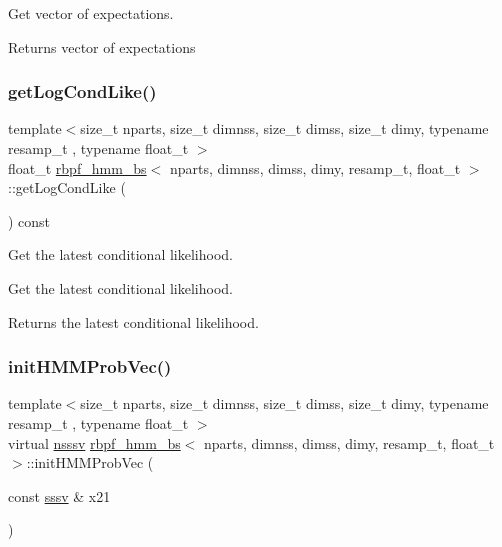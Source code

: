 Get vector of expectations. 

\begin{DoxyReturn}{Returns}
vector of expectations 
\end{DoxyReturn}
\mbox{\label{classrbpf__hmm__bs_a937c6d7cb57f097d0ba981a14cb40976}} 
\subsubsection{\texorpdfstring{get\+Log\+Cond\+Like()}{getLogCondLike()}}
{\footnotesize\ttfamily template$<$size\+\_\+t nparts, size\+\_\+t dimnss, size\+\_\+t dimss, size\+\_\+t dimy, typename resamp\+\_\+t , typename float\+\_\+t $>$ \\
float\+\_\+t \hyperlink{classrbpf__hmm__bs}{rbpf\+\_\+hmm\+\_\+bs}$<$ nparts, dimnss, dimss, dimy, resamp\+\_\+t, float\+\_\+t $>$\+::get\+Log\+Cond\+Like (\begin{DoxyParamCaption}{ }\end{DoxyParamCaption}) const}



Get the latest conditional likelihood. 

Get the latest conditional likelihood. \begin{DoxyReturn}{Returns}
the latest conditional likelihood. 
\end{DoxyReturn}
\mbox{\label{classrbpf__hmm__bs_a0a8e40cbc6b4c8fefae66f03f28fafe1}} 
\subsubsection{\texorpdfstring{init\+H\+M\+M\+Prob\+Vec()}{initHMMProbVec()}}
{\footnotesize\ttfamily template$<$size\+\_\+t nparts, size\+\_\+t dimnss, size\+\_\+t dimss, size\+\_\+t dimy, typename resamp\+\_\+t , typename float\+\_\+t $>$ \\
virtual \hyperlink{classrbpf__hmm__bs_a98c86f40e4ca55ff16156077b11032ca}{nsssv} \hyperlink{classrbpf__hmm__bs}{rbpf\+\_\+hmm\+\_\+bs}$<$ nparts, dimnss, dimss, dimy, resamp\+\_\+t, float\+\_\+t $>$\+::init\+H\+M\+M\+Prob\+Vec (\begin{DoxyParamCaption}\item[{const \hyperlink{classrbpf__hmm__bs_a9a1c8d64f693a34a902dbfcb009d0f96}{sssv} \&}]{x21 }\end{DoxyParamCaption})\hspace{0.3cm}{\ttfamily [pure virtual]}}



